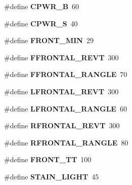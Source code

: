 \begin{DoxyCompactItemize}
\item 
\hypertarget{reactor_8nxc_a738b9657b067e383cd066d4c7ca6f576}{
\#define {\bfseries CPWR\_\-B}~60}
\label{reactor_8nxc_a738b9657b067e383cd066d4c7ca6f576}

\item 
\hypertarget{reactor_8nxc_ae382ea7d9a3437076c5616056836377a}{
\#define {\bfseries CPWR\_\-S}~40}
\label{reactor_8nxc_ae382ea7d9a3437076c5616056836377a}

\item 
\hypertarget{reactor_8nxc_ac9341f36c8b85c8d70f06973c2d9a5bd}{
\#define {\bfseries FRONT\_\-MIN}~29}
\label{reactor_8nxc_ac9341f36c8b85c8d70f06973c2d9a5bd}

\item 
\hypertarget{reactor_8nxc_acb1164349a1fa4b7052e28f7c7c735d4}{
\#define {\bfseries FFRONTAL\_\-REVT}~300}
\label{reactor_8nxc_acb1164349a1fa4b7052e28f7c7c735d4}

\item 
\hypertarget{reactor_8nxc_abda398fa4722b8691dc8c52c733a2814}{
\#define {\bfseries FFRONTAL\_\-RANGLE}~70}
\label{reactor_8nxc_abda398fa4722b8691dc8c52c733a2814}

\item 
\hypertarget{reactor_8nxc_aac0491bc7a39228e57b85de235ef59eb}{
\#define {\bfseries LFRONTAL\_\-REVT}~300}
\label{reactor_8nxc_aac0491bc7a39228e57b85de235ef59eb}

\item 
\hypertarget{reactor_8nxc_ad19631fb45582ad9441719c376c07c3b}{
\#define {\bfseries LFRONTAL\_\-RANGLE}~60}
\label{reactor_8nxc_ad19631fb45582ad9441719c376c07c3b}

\item 
\hypertarget{reactor_8nxc_a623033e48068d57555d513a2d56d0c40}{
\#define {\bfseries RFRONTAL\_\-REVT}~300}
\label{reactor_8nxc_a623033e48068d57555d513a2d56d0c40}

\item 
\hypertarget{reactor_8nxc_a70438bca69ec65d9a29a9f120922464d}{
\#define {\bfseries RFRONTAL\_\-RANGLE}~80}
\label{reactor_8nxc_a70438bca69ec65d9a29a9f120922464d}

\item 
\hypertarget{reactor_8nxc_a7861c2174f24a87c43840f87f3cf8a14}{
\#define {\bfseries FRONT\_\-TT}~100}
\label{reactor_8nxc_a7861c2174f24a87c43840f87f3cf8a14}

\item 
\hypertarget{reactor_8nxc_abac7e3cf78ac568c0622e8497156baf1}{
\#define {\bfseries STAIN\_\-LIGHT}~45}
\label{reactor_8nxc_abac7e3cf78ac568c0622e8497156baf1}


\end{DoxyCompactItemize}
